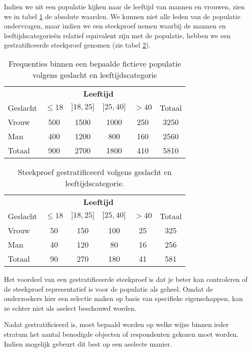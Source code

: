 \begin{example}
  Indien we uit een populatie kijken naar de leeftijd van  mannen en vrouwen, zien we in tabel \ref{tab:frequenties-populatie} de absolute waarden. We kunnen niet alle leden van de populatie ondervragen, maar indien we een steekproef nemen waarbij de mannen en leeftijdscategorieën relatief equivalent zijn met de populatie, hebben we een gestratificeerde steekproef genomen (zie tabel \ref{tab:frequenties-steekproef}).
\end{example}

\begin{table}
  \centering
  \begin{tabular}{l|cccc|c}
    & \multicolumn{4}{c|}{\textbf{Leeftijd}} & \\
    Geslacht & $\le 18$ & $]18,25]$ & $]25, 40]$ & $> 40$ & Totaal\\
    \hline
    Vrouw & 500 & 1500 & 1000 & 250 & 3250 \\
    Man   & 400 & 1200 & 800 & 160 & 2560\\
    \hline
    Totaal & 900 & 2700 & 1800 & 410 & 5810
  \end{tabular}
  \caption{Frequenties binnen een bepaalde fictieve populatie volgens geslacht en leeftijdscategorie}
  \label{tab:frequenties-populatie}
\end{table}

\begin{table}
  \centering
  \begin{tabular}{l|cccc|c}
    & \multicolumn{4}{c|}{\textbf{Leeftijd}} & \\
    Geslacht & $\le 18$ & $]18,25]$ & $]25, 40]$ & $> 40$ & Totaal\\
    \hline
    Vrouw & 50 & 150 & 100 & 25 & 325 \\
    Man   & 40 & 120 & 80 & 16 & 256\\
    \hline
    Totaal & 90 & 270 & 180 & 41 & 581
  \end{tabular}
  \caption{Steekproef gestratificeerd volgens geslacht en leeftijdscategorie.}
  \label{tab:frequenties-steekproef}
\end{table}

Het voordeel van een gestratificeerde steekproef is dat je beter kan controleren of de steekproef representatief is voor de populatie als geheel. Omdat de onderzoekers hier een selectie maken op basis van specifieke eigenschappen, kan ze echter niet als aselect beschouwd worden.

Nadat gestratificieerd is, moet bepaald worden op welke wijze binnen ieder stratum het aantal benodigde objecten of respondenten gekozen moet worden. Indien mogelijk gebeurt dit best op een aselecte manier.

